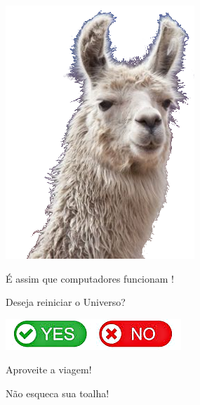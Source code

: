 {\begin{multicols}{2}    
\begin{center}
	\includegraphics[height=1.15\textheight]{./IMG-GIT/lhama.png}
	
\vfil
\columnbreak


	{\color{white}\LARGE É assim que computadores funcionam !}
\end{center}

\begin{flushright}	
	{\color{white}
		\Large
		Deseja reiniciar o Universo?
		
		\includegraphics[width=.6\linewidth]{./IMG-GIT/yes-no.png}		
	}
\end{flushright}
\vfill
\end{multicols}


\pagebreak


{\LARGE \color{white}Aproveite a viagem!}
	
	\vfill
	\pagebreak	
	
	
	{\LARGE \color{white}Não esqueca sua toalha!}
		
}
